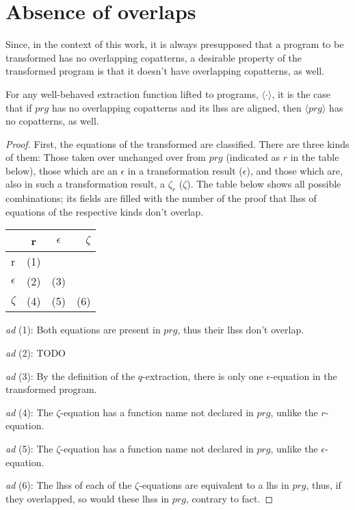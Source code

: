 \section{Absence of overlaps}

Since, in the context of this work, it is always presupposed that a program to be transformed has no overlapping copatterns, a desirable property of the transformed program is that it doesn't have overlapping copatterns, as well.

\begin{proposition}
For any well-behaved extraction function lifted to programs, $\langle \cdot \rangle$, it is the case that if $prg$ has no overlapping copatterns and its lhss are aligned, then $\langle prg \rangle$ has no copatterns, as well.

\begin{proof}
First, the equations of the transformed are classified. There are three kinds of them: Those taken over unchanged over from $prg$ (indicated as $r$ in the table below), those which are an $\epsilon$ in a transformation result ($\epsilon$), and those which are, also in such a transformation result, a $\zeta_r$ ($\zeta$). The table below shows all possible combinations; its fields are filled with the number of the proof that lhss of equations of the respective kinds don't overlap.

\begin{tabular}{ l | c | c | r }  & r & $\epsilon$ & $\zeta$ \\ \hline r & (1) &  &  \\ \hline $\epsilon$ & (2) & (3) &  \\ \hline $\zeta$ & (4) & (5) & (6) \\ \hline \end{tabular}

\textit{ad} (1): Both equations are present in $prg$, thus their lhss don't overlap.

\textit{ad} (2): TODO

\textit{ad} (3): By the definition of the $q$-extraction, there is only one $\epsilon$-equation in the transformed program.

\textit{ad} (4): The $\zeta$-equation has a function name not declared in $prg$, unlike the $r$-equation.

\textit{ad} (5): The $\zeta$-equation has a function name not declared in $prg$, unlike the $\epsilon$-equation.

\textit{ad} (6): The lhss of each of the $\zeta$-equations are equivalent to a lhs in $prg$, thus, if they overlapped, so would these lhss in $prg$, contrary to fact.
\end{proof}
\end{proposition}